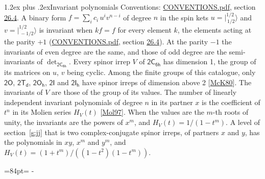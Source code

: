 \documentclass[10pt,a4paper]{article}
\makeatletter
\renewcommand\section{\@startsection{section}{1}{\z@}{-3ex plus -1ex minus -.2ex}%
  {1.2ex plus .2ex}{\normalfont\large\sffamily\bfseries\color{parttitle}}}
\newcommand{\needspace}[1]{\par\penalty-100\begingroup\dimen0=#1\relax\dimen2=\pagegoal
  \advance\dimen2-\pagetotal\ifdim\dimen0>\dimen2\relax\ifdim\dimen2>0pt\vfil\break\fi\fi
  \endgroup}
\numberwithin{equation}{section}
\newcommand{\grp}[1]{\mathsf{#1}}
\newcommand{\jm}[2]{\bigl\lvert{}^{#1}_{\,#2}\bigr\rangle}
\makeatother
\begin{document}
\section{Invariant polynomials}\label{s:invariants}
Conventions: \href{../../CONVENTIONS.pdf}{CONVENTIONS.pdf}, section \href{../../CONVENTIONS.pdf\#conv.26.4}{26.4}.
\leavevmode\label{n:local.binary.form}A binary form $f = \sum_i c_i\, u^i v^{n-i}$ of degree $n$ in the spin kets $u = \jm{1/2}{1/2}$ and $v = \jm{1/2}{-1/2}$ is invariant when $k f = f$ for every element $k$, the elements acting at the parity $+1$ (\href{../../CONVENTIONS.pdf}{CONVENTIONS.pdf}, section \href{../../CONVENTIONS.pdf\#conv.26.4}{26.4}). At the parity $-1$ the invariants of even degree are the same, and those of odd degree are the semi-invariants of $\det_{\grp{2C_{6h}}}$.
\leavevmode\label{n:function.hilbert}Every spinor irrep $V$ of $\grp{2C_{6h}}$ has dimension 1, the group of its matrices on $u$, $v$ being cyclic. Among the finite groups of this catalogue, only $\grp{2O}$, $\grp{2T_{d}}$, $\grp{2O_{h}}$, $\grp{2I}$ and $\grp{2I_{h}}$ have spinor irreps of dimension above 2 [\href{../../../REFERENCES.pdf\#ref.McK80}{McK80}]. The invariants of $V$ are those of the group of its values. \label{n:local.partner.x}The number of linearly independent invariant polynomials of degree $n$ in its partner $x$ is the coefficient of $t^n$ in its Molien series $H_V(t)$ [\href{../../../REFERENCES.pdf\#ref.Mol97}{Mol97}]. When the values are the $m$-th roots of unity, the invariants are the powers of $x^{m}$, and $H_V(t) = 1/(1 - t^{m})$. A level of section~\ref{s:jj} that is two complex-conjugate spinor irreps, of partners $x$ and $y$, has the polynomials in $xy$, $x^{m}$ and $y^{m}$, and $H_V(t) = (1 + t^{m})/((1 - t^{2})(1 - t^{m}))$.
\needspace{84pt}
\end{document}
